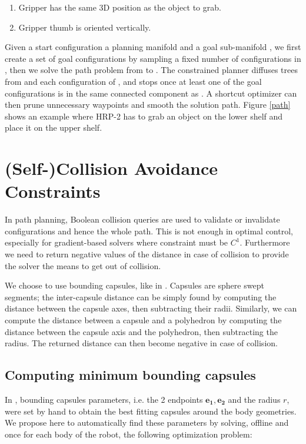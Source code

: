 \begin{enumerate}
  \item Gripper has the same 3D position as the object to grab.
  \item Gripper thumb is oriented vertically.
\end{enumerate}

Given a start configuration  a planning manifold \manifold
and a goal sub-manifold \goalmanifold, we first create a set of goal
configurations  by sampling a fixed number of configurations
in \goalmanifold, then we solve the path problem from  to
. The constrained planner diffuses trees from  and
each configuration of , and stops once at least one of the
goal configurations is in the same connected component as
. A shortcut optimizer can then prune unnecessary waypoints
and smooth the solution path. Figure \ref{path} shows an example where
HRP-2 has to grab an object on the lower shelf and place it on the
upper shelf.

\section{(Self-)Collision Avoidance Constraints}
\label{distance-constraints}
In path planning, Boolean collision queries are used to validate or
invalidate configurations and hence the whole path. This is not enough
in optimal control, especially for gradient-based solvers where
constraint must be $C^1$. Furthermore we need to return negative
values of the distance in case of collision to provide the solver the
means to get out of collision.

We choose to use bounding capsules, like in
\cite{Kanoun2011}. Capsules are sphere swept segments; the
inter-capsule distance can be simply found by computing the distance
between the capsule axes, then subtracting their radii. Similarly, we
can compute the distance between a capsule and a polyhedron by
computing the distance between the capsule axis and the polyhedron,
then subtracting the radius. The returned distance can then become
negative in case of collision.

\subsection{Computing minimum bounding capsules}
In \cite{Kanoun2011}, bounding capsules parameters, i.e. the 2
endpoints $\mathbf{e_1}, \mathbf{e_2}$ and the radius $r$, were set by
hand to obtain the best fitting capsules around the body
geometries. We propose here to automatically find these parameters by
solving, offline and once for each body of the robot, the following
optimization problem:

